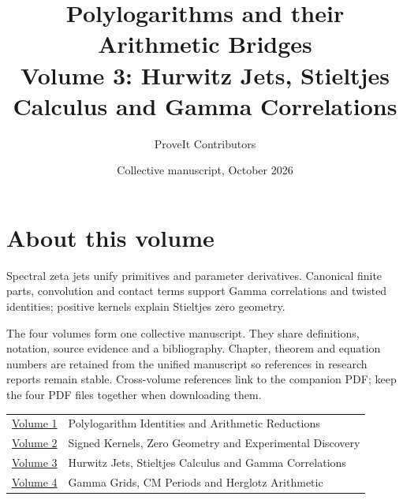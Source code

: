 

\title{Polylogarithms and their Arithmetic Bridges\\[8pt]
\large Volume 3: Hurwitz Jets, Stieltjes Calculus and Gamma Correlations}
\author{ProveIt Contributors}
\date{Collective manuscript, October 2026}

\pagestyle{plain}
\frontmatter
\maketitle
\chapter*{About this volume}
Spectral zeta jets unify primitives and parameter derivatives. Canonical finite parts, convolution and contact terms support Gamma correlations and twisted identities; positive kernels explain Stieltjes zero geometry.

The four volumes form one collective manuscript. They share definitions,
notation, source evidence and a bibliography. Chapter, theorem and equation
numbers are retained from the unified manuscript so references in research
reports remain stable. Cross-volume references link to the companion PDF;
keep the four PDF files together when downloading them.

\begin{center}
\begin{tabular}{@{}p{0.8in}p{5.5in}@{}}
\href{volume-1-polylogarithm-identities.pdf}{Volume 1} & Polylogarithm Identities and Arithmetic Reductions \\
\href{volume-2-signed-kernels.pdf}{Volume 2} & Signed Kernels, Zero Geometry and Experimental Discovery \\
\href{volume-3-hurwitz-stieltjes.pdf}{Volume 3} & Hurwitz Jets, Stieltjes Calculus and Gamma Correlations \\
\href{volume-4-cm-and-herglotz.pdf}{Volume 4} & Gamma Grids, CM Periods and Herglotz Arithmetic \\
\end{tabular}
\end{center}

